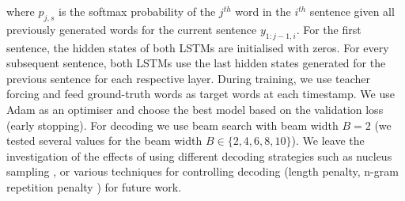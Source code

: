 \documentclass[11pt,a4paper]{article}
\begin{document}
where $p_{j,s}$ is the softmax probability of the $j^{th}$ word in the $i^{th}$ sentence given all previously generated words for the current sentence $y_{1:j-1,i}$.
For the first sentence, the hidden states of both LSTMs are initialised with zeros.
For every subsequent sentence, both LSTMs use the last hidden states generated for the previous sentence for each respective layer.
During training, we use teacher forcing and feed ground-truth words as target words at each timestamp.
We use Adam \cite{adam14} as an optimiser and choose the best model based on the validation loss (early stopping).
For decoding we use beam search \cite{beam17} with beam width $B=2$ (we tested several values for the beam width $B \in \{2, 4, 6, 8, 10\}$).
We leave the investigation of the effects of using different decoding strategies such as nucleus sampling \cite{Holtzman2019}, or various techniques for controlling decoding (length penalty, n-gram repetition penalty \cite{opennmt2017,paulus2017deep}) for future work.








\end{document}
